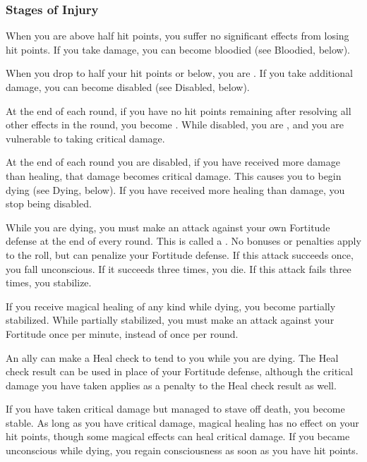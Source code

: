         \subsubsection{Stages of Injury}

             When you are above half hit points, you suffer no significant effects from losing hit points.
            If you take damage, you can become bloodied (see Bloodied, below).

             When you drop to half your hit points or below, you are \bloodied.
            If you take additional damage, you can become disabled (see Disabled, below).

            \label{Disabled} At the end of each round, if you have no hit points remaining after resolving all other effects in the round, you become \disabled.
            While disabled, you are \staggered, and you are vulnerable to taking critical damage.

            At the end of each round you are disabled, if you have received more damage than healing, that damage becomes critical damage.
            This causes you to begin dying (see Dying, below).
            If you have received more healing than damage, you stop being disabled.

            \label{Dying} While you are dying, you must make an attack against your own Fortitude defense at the end of every round.
            This is called a .
            No bonuses or penalties apply to the roll, but  can penalize your Fortitude defense.
            If this attack succeeds once, you fall unconscious.
            If it succeeds three times, you die.
            If this attack fails three times, you stabilize.

            If you receive magical healing of any kind while dying, you become partially stabilized.
            While partially stabilized, you must make an attack against your Fortitude once per minute, instead of once per round.

            An ally can make a Heal check to tend to you while you are dying.
            The Heal check result can be used in place of your Fortitude defense, although the critical damage you have taken applies as a penalty to the Heal check result as well.

            \label{Stable}
            If you have taken critical damage but managed to stave off death, you become stable.
            As long as you have critical damage, magical healing has no effect on your hit points, though some magical effects can heal critical damage.
            If you became unconscious while dying, you regain consciousness as soon as you have hit points.

